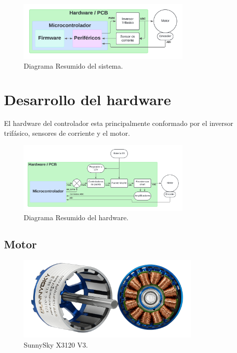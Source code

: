\documentclass[11pt]{report}
\begin{document}
\begin{figure}[ht]
	\centering
	\includegraphics[width=0.76\textwidth]{imagenes/Diagramas/Diagramas - ultra resumen.png}
	\caption{Diagrama Resumido del sistema.}
	\label{flujo_resumen}
\end{figure}
\FloatBarrier

\section{Desarrollo del hardware}
El hardware del controlador esta principalmente conformado por el inversor trifásico, sensores de corriente y el motor.

\begin{figure}[ht]
	\centering
	\includegraphics[width=0.76\textwidth]{imagenes/Diagramas/Diagramas - resumen hardware.png}
	\caption{Diagrama Resumido del hardware.}
	\label{flujo_resumen_hardware}
\end{figure}
\FloatBarrier

\subsection{Motor}

\begin{figure}[ht]
	\centering
	\includegraphics[width=0.8\textwidth]{imagenes/Motor/X3120.png}
	\caption{SunnySky X3120 V3.}
	\label{X3120}
\end{figure}
\FloatBarrier
\end{document}

